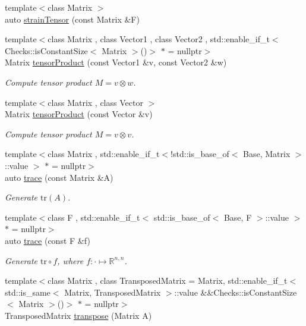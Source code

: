 \begin{DoxyCompactItemize}
{\footnotesize template$<$class Matrix $>$ }\\auto \hyperlink{namespaceFunG_1_1LinearAlgebra_aca163950a2c0cb159fb83629b08337ba}{strain\+Tensor} (const Matrix \&F)
\item 
{\footnotesize template$<$class Matrix , class Vector1 , class Vector2 , std\+::enable\+\_\+if\+\_\+t$<$ Checks\+::is\+Constant\+Size$<$ Matrix $>$()$>$ $\ast$  = nullptr$>$ }\\Matrix \hyperlink{group__LinearAlgebraGroup_ga5d0e066e6184fb3324d96d20087b5578}{tensor\+Product} (const Vector1 \&v, const Vector2 \&w)
\begin{DoxyCompactList}\small\item\em Compute tensor product $ M = v \otimes w $. \end{DoxyCompactList}\item 
{\footnotesize template$<$class Matrix , class Vector $>$ }\\Matrix \hyperlink{group__LinearAlgebraGroup_gae5e82b9e66319511dae5ff0d9304a6b7}{tensor\+Product} (const Vector \&v)
\begin{DoxyCompactList}\small\item\em Compute tensor product $ M = v \otimes v $. \end{DoxyCompactList}\item 
{\footnotesize template$<$class Matrix , std\+::enable\+\_\+if\+\_\+t$<$!std\+::is\+\_\+base\+\_\+of$<$ Base, Matrix $>$\+::value $>$ $\ast$  = nullptr$>$ }\\auto \hyperlink{group__LinearAlgebraGroup_ga4d73eb4d46dd9196a31e2d6d557d509e}{trace} (const Matrix \&A)
\begin{DoxyCompactList}\small\item\em Generate $\mathrm{tr}(A)$. \end{DoxyCompactList}\item 
{\footnotesize template$<$class F , std\+::enable\+\_\+if\+\_\+t$<$ std\+::is\+\_\+base\+\_\+of$<$ Base, F $>$\+::value $>$ $\ast$  = nullptr$>$ }\\auto \hyperlink{group__LinearAlgebraGroup_ga950717870525c43be79245413717673c}{trace} (const F \&f)
\begin{DoxyCompactList}\small\item\em Generate $\mathrm{tr}\circ f$, where $f:\cdot\mapsto\mathbb{R}^{n,n} $. \end{DoxyCompactList}\item 
{\footnotesize template$<$class Matrix , class Transposed\+Matrix  = Matrix, std\+::enable\+\_\+if\+\_\+t$<$ std\+::is\+\_\+same$<$ Matrix, Transposed\+Matrix $>$\+::value \&\&\+Checks\+::is\+Constant\+Size$<$ Matrix $>$()$>$ $\ast$  = nullptr$>$ }\\Transposed\+Matrix \hyperlink{group__LinearAlgebraGroup_gaf299ac9490ae23da0a3a3d784e379d1f}{transpose} (Matrix A)

\end{DoxyCompactItemize}
